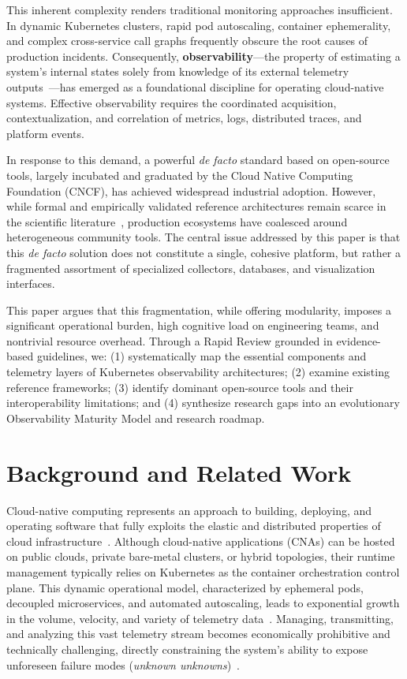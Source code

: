 \documentclass[sigconf, anonymous, balance=false]{acmart}
\begin{document}
This inherent complexity renders traditional monitoring approaches insufficient. In dynamic Kubernetes clusters, rapid pod autoscaling, container ephemerality, and complex cross-service call graphs frequently obscure the root causes of production incidents. Consequently, \textbf{observability}—the property of estimating a system's internal states solely from knowledge of its external telemetry outputs~\cite{kalman_1959, songtab_1984}—has emerged as a foundational discipline for operating cloud-native systems. Effective observability requires the coordinated acquisition, contextualization, and correlation of metrics, logs, distributed traces, and platform events.

In response to this demand, a powerful \textit{de facto} standard based on open-source tools, largely incubated and graduated by the Cloud Native Computing Foundation (CNCF), has achieved widespread industrial adoption. However, while formal and empirically validated reference architectures remain scarce in the scientific literature~\cite{araujo_24, zanatta_23, kosinska_2023}, production ecosystems have coalesced around heterogeneous community tools. The central issue addressed by this paper is that this \textit{de facto} solution does not constitute a single, cohesive platform, but rather a fragmented assortment of specialized collectors, databases, and visualization interfaces.

This paper argues that this fragmentation, while offering modularity, imposes a significant operational burden, high cognitive load on engineering teams, and nontrivial resource overhead. Through a Rapid Review grounded in evidence-based guidelines, we: (1) systematically map the essential components and telemetry layers of Kubernetes observability architectures; (2) examine existing reference frameworks; (3) identify dominant open-source tools and their interoperability limitations; and (4) synthesize research gaps into an evolutionary Observability Maturity Model and research roadmap.

\section{Background and Related Work}
\label{sec:background}

Cloud-native computing represents an approach to building, deploying, and operating software that fully exploits the elastic and distributed properties of cloud infrastructure~\cite{aws_2025, gannon_2017}. Although cloud-native applications (CNAs) can be hosted on public clouds, private bare-metal clusters, or hybrid topologies, their runtime management typically relies on Kubernetes as the container orchestration control plane. This dynamic operational model, characterized by ephemeral pods, decoupled microservices, and automated autoscaling, leads to exponential growth in the volume, velocity, and variety of telemetry data~\cite{sridharan_2018}. Managing, transmitting, and analyzing this vast telemetry stream becomes economically prohibitive and technically challenging, directly constraining the system's ability to expose unforeseen failure modes (\textit{unknown unknowns})~\cite{sridharan_2018, sakinala_2025}.
\end{document}
